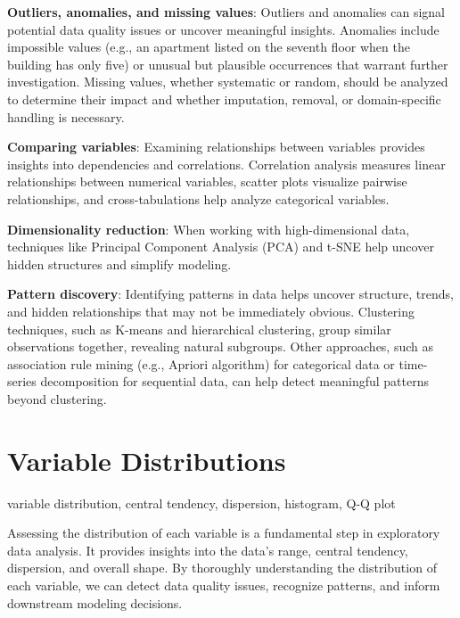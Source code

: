 \documentclass[12pt,openany, draft]{book}
\begin{document}
\textbf{Outliers, anomalies, and missing values}: Outliers and anomalies can signal potential data quality issues or uncover meaningful insights. Anomalies include impossible values (e.g., an apartment listed on the seventh floor when the building has only five) or unusual but plausible occurrences that warrant further investigation. Missing values, whether systematic or random, should be analyzed to determine their impact and whether imputation, removal, or domain-specific handling is necessary.
\newline

\textbf{Comparing variables}: Examining relationships between variables provides insights into dependencies and correlations. Correlation analysis measures linear relationships between numerical variables, scatter plots visualize pairwise relationships, and cross-tabulations help analyze categorical variables.
\newline

\textbf{Dimensionality reduction}: When working with high-dimensional data, techniques like Principal Component Analysis (PCA) and t-SNE help uncover hidden structures and simplify modeling.
\newline

\textbf{Pattern discovery}: Identifying patterns in data helps uncover structure, trends, and hidden relationships that may not be immediately obvious. Clustering techniques, such as K-means and hierarchical clustering, group similar observations together, revealing natural subgroups. Other approaches, such as association rule mining (e.g., Apriori algorithm) for categorical data or time-series decomposition for sequential data, can help detect meaningful patterns beyond clustering.
\newline


\section{Variable Distributions}

\begin{keywordsbox}
variable distribution, central tendency, dispersion, histogram, Q-Q plot
\end{keywordsbox}

Assessing the distribution of each variable is a fundamental step in exploratory data analysis. It provides insights into the data's range, central tendency, dispersion, and overall shape. By thoroughly understanding the distribution of each variable, we can detect data quality issues, recognize patterns, and inform downstream modeling decisions.
\end{document}
